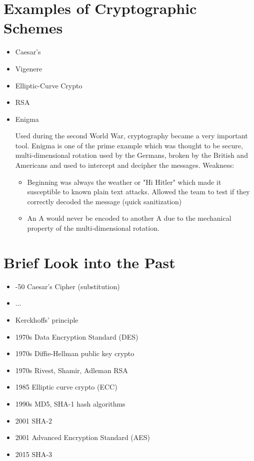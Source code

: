 \documentclass[11pt]{article}
\begin{document}
\section*{Examples of Cryptographic Schemes}

\begin{itemize}
	\item Caesar's
	\item Vigenere
	\item Elliptic-Curve Crypto
	\item RSA
	\item Enigma

	Used during the second World War, cryptography became a very important tool. Enigma is one of the prime example which was thought to be secure, multi-dimensional rotation used by the Germans, broken by the British and Americans and used to intercept and decipher the messages.
	Weakness: 
	\begin{itemize}
		\item Beginning was always the weather or "Hi Hitler" which made it susceptible to known plain text attacks. Allowed the team to test if they correctly decoded the message (quick sanitization)  
		\item An A would never be encoded to another A due to the mechanical property of the multi-dimensional rotation. 
	\end{itemize}
\end{itemize}


\section*{Brief Look into the Past}

\begin{itemize}
	\item -50 Caesar's Cipher (substitution)
	\item ...
	\item Kerckhoffs' principle
	\item 1970s Data Encryption Standard (DES)
	\item 1970s Diffie-Hellman public key crypto
	\item 1970s Rivest, Shamir, Adleman RSA
	\item 1985 Elliptic curve crypto (ECC)
	\item 1990s MD5, SHA-1 hash algorithms
	\item 2001 SHA-2
	\item 2001 Advanced Encryption Standard (AES)
	\item 2015 SHA-3
\end{itemize}
\end{document}
